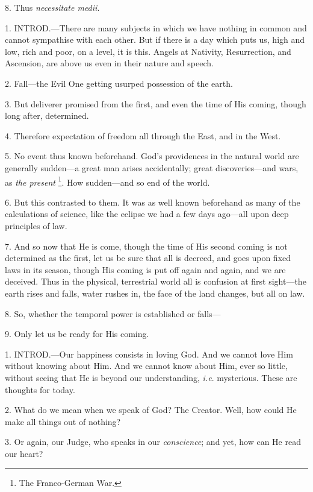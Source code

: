 8. Thus \emph{necessitate medii}.


1. INTROD.—There
are many subjects in which we have nothing in common and cannot
sympathise with each other. But if there is a day which puts us, high
and low, rich and poor, on a level, it is this. Angels at Nativity,
Resurrection, and Ascension, are above us even in their nature and
speech.

2. Fall—the Evil One getting usurped possession
of the earth.

3. But deliverer promised from the first, and
even the time of His coming, though long after, determined.

4. Therefore expectation of freedom all through
the East, and in the West.

5. No event thus known beforehand. God's
providences in the natural world are generally sudden—a great man
arises accidentally; great discoveries—and wars, as \emph{the present}
\footnote{The Franco-German War.}. How sudden—and so
end of the world.

6. But this contrasted to them. It was as well
known beforehand as many of the calculations of science, like the
eclipse we had a few days ago—all upon deep principles of law.

7. And so now that He is come, though the time of
His second coming is not determined as the first, let us be sure that
all is decreed, and goes upon fixed laws in its season, though His
coming is put off again and again, and we are deceived. Thus in the
physical, terrestrial world all is confusion at first sight—the
earth rises and falls, water rushes in, the face of the land changes,
but all on law.

8. So, whether the temporal power is established
or falls—

9. Only let us be ready for His coming.


1. INTROD.—Our
happiness consists in loving God. And we cannot love Him without
knowing about Him. And we cannot know about Him, ever so little,
without seeing that He is beyond our understanding, \emph{i.e}.
mysterious. These are thoughts for today.

2. What do we mean when we speak of God? The Creator. Well, how could He make all things out of nothing?

3. Or again, our Judge, who speaks in our \emph{conscience};
and yet, how can He read our heart?

